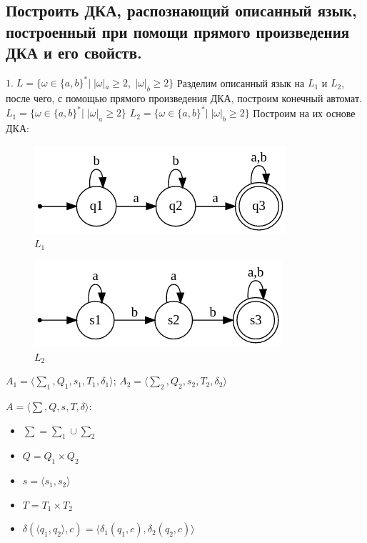 \documentclass[a4paper,12pt]{article}
\begin{document}
\subsection*{Построить ДКА, распознающий описанный язык, построенный при помощи прямого произведения ДКА и его свойств.}
\Large $1.\;L = {\{\omega \in \{a,b\}^*|\;|\omega|_a \ge 2,\;|\omega|_b \ge 2\}}$\newline
Разделим описанный язык на $L_1$ и $L_2$, после чего, с помощью прямого произведения ДКА, построим конечный автомат.\newline
\Large $L_1 = {\{\omega \in \{a,b\}^*|\;|\omega|_a \ge 2\}}$\newline
\Large $L_2 = {\{\omega \in \{a,b\}^*|\;|\omega|_b \ge 2\}}$\newline
Построим на их основе ДКА:\newline
\begin{figure}[h]
\centering
\includegraphics[scale=0.75]{2_1_1}
\caption{$L_1$}
\end{figure}
\begin{figure}[h]
\centering
\includegraphics[scale=0.75]{2_1_2}
\caption{$L_2$}
\end{figure}\newline
\begingroup
\raggedleft 
$A_1 = {\langle\sum_1 , Q_1, s_1, T_1, \delta_1 \rangle}$;
$A_2 = {\langle\sum_2 , Q_2, s_2, T_2, \delta_2 \rangle}$\newline
\endgroup
\begingroup
\raggedright 
$A = {\langle\sum , Q, s, T, \delta \rangle}$:
\begin{itemize}
\item $\sum = \sum_1 \cup \sum_2$
\item $Q = Q_1 \times Q_2$
\item $s = \langle s_1 , s_2\rangle$
\item $T = T_1 \times T_2$
\item $\delta(\langle q_1 , q_2\rangle, c) =  \langle \delta_1 (q_1 , c), \delta_2 (q_2, c) \rangle$
\end{itemize}
\end{document}
